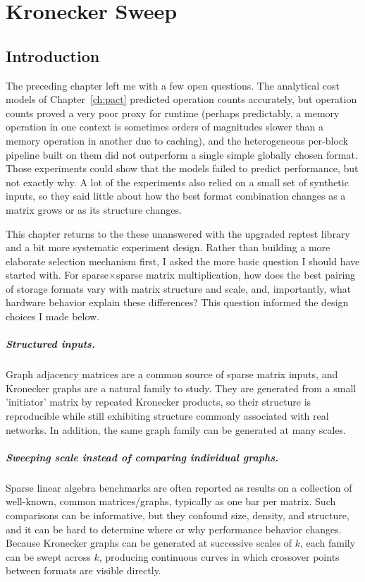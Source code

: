 \chapter{Kronecker Sweep}
\label{ch:kron_taco}

\section{Introduction}
The preceding chapter left me with a few open questions. The analytical cost
models of Chapter~\ref{ch:pact} predicted operation counts accurately, but
operation counts proved a very poor proxy for runtime (perhaps predictably, a memory operation in one context is sometimes orders of magnitudes
slower than a memory operation in another due to caching), and the heterogeneous
per-block pipeline built on them did not outperform a single simple globally
chosen format. Those experiments could show that the models
failed to predict performance, but not exactly why. A lot of the experiments also relied on
a small set of synthetic inputs, so they said little about how
the best format combination changes as a matrix grows or as its
structure changes.

This chapter returns to the these unanswered with the upgraded reptest library and a bit more systematic experiment design. Rather than building a more
elaborate selection mechanism first, I asked the more basic question I should have started with. For
sparse$\times$sparse matrix multiplication, how does the best pairing of storage formats vary with matrix structure and scale, and, importantly, what hardware
behavior explain these differences? This question informed the design choices I made below.

\paragraph{Structured inputs.}
Graph adjacency matrices are a common source of sparse matrix inputs, and
Kronecker graphs \cite{kronecker} are a natural family to study. They are
generated from a small 'initiator' matrix by repeated Kronecker products, so
their structure is reproducible while still exhibiting structure commonly associated with real networks.
In addition, the same graph family can be generated at many scales.

\paragraph{Sweeping scale instead of comparing individual graphs.}
Sparse linear algebra benchmarks are often reported as results on a
collection of well-known, common matrices/graphs, typically as one bar per matrix.
Such comparisons can be informative, but they confound size, density, and
structure, and it can be hard to determine where or why performance behavior changes. Because
Kronecker graphs can be generated at successive scales of $k$, each family
can be swept across $k$, producing continuous curves in which crossover
points between formats are visible directly.

